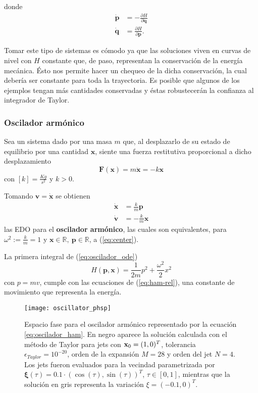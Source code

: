 donde
\begin{align}
 \dot{\mathbf{p}} &= -\frac{\partial{H}}{\partial{\mathbf{q}}} \nonumber \\
 \dot{\mathbf{q}} &= \frac{\partial{H}}{\partial{\mathbf{p}}}.
\label{eq:ham-rel}
\end{align}

Tomar este tipo de sistemas es cómodo ya que las soluciones viven en curvas de nivel con $H$ constante que, de paso, representan la conservación de la energía mecánica. Ésto nos permite hacer un chequeo de la dicha conservación, la cual debería ser constante para toda la trayectoria. Es posible que algunos de los ejemplos tengan más cantidades conservadas y éstas robustecerán la confianza al integrador de Taylor.

\subsubsection{Oscilador armónico}
\label{sec:oscilador}
Sea un sistema dado por una masa $m$ que, al desplazarlo de su estado de equilibrio por una cantidad $\mathbf{x}$, siente una fuerza restitutiva proporcional a dicho desplazamiento
\begin{equation}
 \mathbf{F}(\mathbf{x}) = m \ddot{\mathbf{x}} = - k\mathbf{x}
 \label{eq:oscilador_force}
\end{equation}
con $[k] = \frac{Kg}{s^2}$  y $k>0$. 

Tomando $\mathbf{v} = \dot{\mathbf{x}}$ se obtienen
\begin{align}
 \dot{\mathbf{x}} &= \frac{k}{m} \mathbf{p} \nonumber \\
 \dot{\mathbf{v}} &= - \frac{k}{m} \mathbf{x}
 \label{eq:oscilador_ode}
\end{align}
las EDO para el \textbf{oscilador armónico}, las cuales son equivalentes, para $\omega^2 := \frac{k}{m} = 1$ y $\mathbf{x} \in \mathbb{R},\ \mathbf{p} \in \mathbb{R}$, a (\ref{eq:center}). 

La primera integral de (\ref{eq:oscilador_ode})
\begin{equation}
 H(\mathbf{p},\mathbf{x}) = \frac{1}{2m}p^2 + \frac{\omega^2}{2} x^2
 \label{eq:oscilador_ham}
\end{equation}
con $p=mv$, cumple con las ecuaciones de (\ref{eq:ham-rel}), una constante de movimiento que representa la energía.

\begin{figure}[h!]
 \centering
 \texttt{[image: oscillator\_phsp]}
 \caption{Espacio fase para el oscilador armónico representado por la ecuación \ref{eq:oscilador_ham}. En negro aparece la solución calculada con el método de Taylor para jets con $\mathbf{x}_0 = (1,0)^T$, tolerancia $\epsilon_{Taylor} = 10^{-20}$, orden de la expansión $M = 28$ y orden del jet $N=4$. Los jets fueron evaluados para la vecindad parametrizada por $\mathbf{\xi}(\tau) = 0.1\cdot \left( \cos(\tau), \sin(\tau) \right)^T$, $\tau \in [0,1]$, mientras que la solución en gris representa la variación $\xi = (-0.1,0)^T$.}
 \label{fig:oscilador_phsp}
\end{figure}

